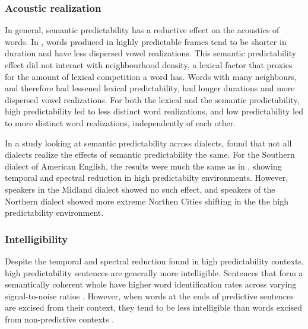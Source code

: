 \documentclass[11pt]{article} %
\begin{document}
\subsubsection{Acoustic realization}

In general, semantic predictability has a reductive effect on the acoustics of words.  In \citet{Scarborough2010}, words produced in highly predictable frames tend to be shorter in duration and have less dispersed vowel realizations.  This semantic predictability effect did not interact with neighbourhood density, a lexical factor that proxies for the amount of lexical competition a word has.  Words with many neighbours, and therefore had lessened lexical predictability, had longer durations and more dispersed vowel realizations.  For both the lexical and the semantic predictability, high predictability led to less distinct word realizations, and low predictability led to more distinct word realizations, independently of each other.

In a study looking at semantic predictability across dialects, \citet{Clopper2008} found that not all dialects realize the effects of semantic predictability the same.  For the Southern dialect of American English, the results were much the same as in \citet{Scarborough2010}, showing temporal and spectral reduction in high predictabilty environments.  However, speakers in the Midland dialect showed no such effect, and speakers of the Northern dialect showed more extreme Northen Cities shifting in the the high predictability environment.

\subsubsection{Intelligibility}

Despite the temporal and spectral reduction found in high predictability contexts, high predictability sentences are generally more intelligible.  Sentences that form a semantically coherent whole have higher word identification rates across varying signal-to-noise ratios \citep{Kalikow1977}.  However, when words at the ends of predictive sentences are excised from their context, they tend to be less intelligible than words excised from non-predictive contexts \citep{Lieberman1963}.  %
\end{document}
